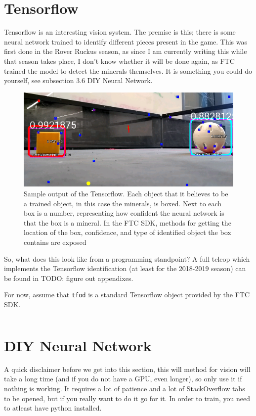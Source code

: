 \documentclass[../main.tex]{subfiles}
\begin{document}
\section{Tensorflow}
Tensorflow is an interesting vision system. The premise is this; there is some neural network trained to identify different pieces present in the game. This was first done in the Rover Ruckus season, as since I am currently writing this while that season takes place, I don't know whether it will be done again, as FTC trained the model to detect the minerals themselves. It is something you could do yourself, see subsection 3.6 DIY Neural Network. 
\begin{figure}[H]
    \includegraphics[width=400pt]{sections/vision/images/tensorflowOutput.png}
    \caption{Sample output of the Tensorflow. Each object that it believes to be a trained object, in this case the minerals, is boxed. Next to each box is a number, representing how confident the neural network is that the box is a mineral. In the FTC SDK, methods for getting the location of the box, confidence, and type of identified object the box contains are exposed}
\end{figure}

So, what does this look like from a programming standpoint? A full teleop which implements the Tensorflow identification (at least for the 2018-2019 season) can be found in TODO: figure out appendixes.

For now, assume that \verb|tfod| is a standard Tensorflow object provided by the FTC SDK.

\begin{lstlisting}[language=Java]
\end{lstlisting}

\section{DIY Neural Network}
A quick disclaimer before we get into this section, this will method for vision will take a long time (and if you do not have a GPU, even longer), so only use it if nothing is working. It requires a lot of patience and a lot of StackOverflow tabs to be opened, but if you really want to do it go for it. In order to train, you need to atleast have python installed.
\end{document}
